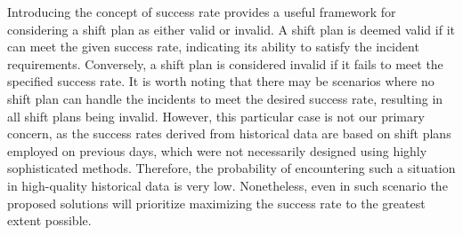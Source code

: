 Introducing the concept of success rate provides a useful framework for
considering a shift plan as either valid or invalid. A shift plan is deemed
valid if it can meet the given success rate, indicating its ability to satisfy
the incident requirements. Conversely, a shift plan is considered invalid if it
fails to meet the specified success rate. It is worth noting that there may be
scenarios where no shift plan can handle the incidents to meet the desired
success rate, resulting in all shift plans being invalid. However, this
particular case is not our primary concern, as the success rates derived from
historical data are based on shift plans employed on previous days, which were
not necessarily designed using highly sophisticated methods. Therefore, the
probability of encountering such a situation in high-quality historical data is
very low. Nonetheless, even in such scenario the proposed solutions will
prioritize maximizing the success rate to the greatest extent possible.